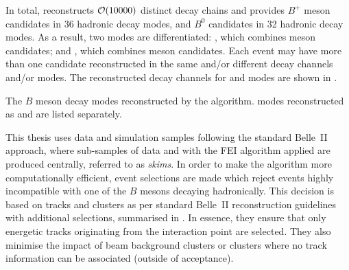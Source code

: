 In total, \FEI reconstructs ${\cal O}(10000)$ distinct decay chains and provides $B^+$ meson candidates in 36 hadronic decay modes, and $B^0$ candidates in 32 hadronic decay modes.
As a result, two \FEI modes are differentiated: 
\feiBp, which combines \Bpm meson candidates;
and \feiBz, which combines \Bz meson candidates.
Each event may have more than one candidate reconstructed in the same and/or different decay channels and/or \FEI modes.
The reconstructed decay channels for \feiBp and \feiBz modes are shown in .

\begin{table}
    \centering
    \caption{\label{tab:fei_modes}
    The $B$ meson decay modes reconstructed by the \FEI algorithm.
    \FEI modes reconstructed as \feiBp and \feiBz are listed separately.
    }
    
\end{table}


This thesis uses data and simulation samples following the standard Belle~II approach, where sub-samples of data and \MC with the FEI algorithm applied are produced centrally, referred to as \textit{\FEI skims}.
In order to make the \FEI algorithm more computationally efficient, event selections are made which reject events highly incompatible with one of the $B$ mesons decaying hadronically.
This decision is based on tracks and clusters as per standard Belle~II reconstruction guidelines with additional selections, summarised in .
In essence, they ensure that only energetic tracks originating from the interaction point are selected.
They also minimise the impact of beam background clusters or clusters where no track information can be associated (outside of \CDC acceptance).

\begin{table}[htbp!]
    \centering
     \caption{\label{tab:fei_objects} Definitions for objects used in \FEI selections.}
\end{table}

